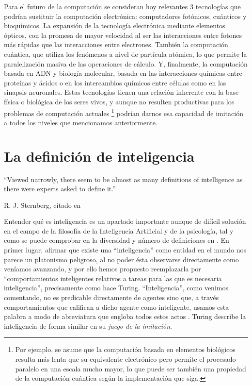 \documentclass[12pt]{memoir}
\begin{document}
Para el futuro de la computación se consideran hoy relevantes 3 tecnologías que podrían sustituir la computación electrónica: computadores fotónicos, cuánticos y bioquímicos. La expansión de la tecnología electrónica mediante elementos ópticos, con la promesa de mayor velocidad al ser las interacciones entre fotones más rápidas que las interacciones entre electrones. También la computación cuántica, que utiliza los fenómenos a nivel de partícula atómica, lo que permite la paralelización masiva de las operaciones de cálculo. Y, finalmente, la computación basada en ADN y biología molecular, basada en las interacciones químicas entre proteínas y ácidos o en los intercambios químicos entre células como en las sinapsis neuronales. Estas tecnologías tienen una relación inherente con la base física o biológica de los seres vivos, y aunque no resulten productivas para los problemas de computación actuales \footnote{Por ejemplo, se asume que la computación basada en elementos biológicos resulta más lenta que su equivalente electrónico pero permite el procesado paralelo en una escala mucho mayor, lo que puede ser también una propiedad de la computación cuántica según la implementación que siga.} podrían darnos esa capacidad de imitación a todos los niveles que mencionamos anteriormente.


\chapter{La definición de inteligencia}
\label{intelligence}

\epigraph{``Viewed narrowly, there seem to be almost as many definitions of
intelligence as there were experts asked to define it.''}{R. J. Sternberg, citado en \cite{intDefs}}

Entender qué es inteligencia es un apartado importante aunque de difícil solución en el campo de la filosofía de la Inteligencia Artificial y de la psicología, tal y como se puede comprobar en la diversidad y número de definiciones en \parencite{intDefs}. En primer lugar, afirmar que existe una ``inteligencia'' como entidad en el mundo nos parece un platonismo peligroso, al no poder ésta observarse directamente como veníamos avanzando, y por ello hemos propuesto reemplazarla por ``comportamientos inteligentes relativos a tareas para las que es necesaria inteligencia'', precisamente como hace Turing. ``Inteligencia'', como venimos comentando, no es predicable directamente de agentes sino que, a través comportamientos que califican a dicho agente como inteligente, usamos esta palabra a modo de abreviatura que engloba todos estos actos \parencite{diamantAdvancesAI}. Turing describe la inteligencia de forma similar en su \textit{juego de la imitación}.
\end{document}
